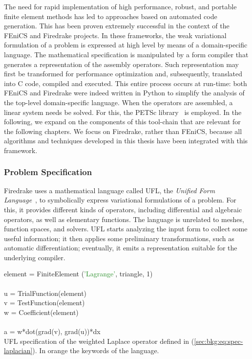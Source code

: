 The need for rapid implementation of high performance, robust, and portable finite element methods has led to approaches based on automated code generation. This has been proven extremely successful in the context of the FEniCS \citep{Fenics} and Firedrake \citep{firedrake-paper} projects. In these frameworks, the weak variational formulation of a problem is expressed at high level by means of a domain-specific language. The mathematical specification is manipulated by a form compiler that generates a representation of the assembly operators. Such representation may first be transformed for performance optimization and, subsequently, translated into C code, compiled and executed. This entire process occurs at run-time: both FEniCS and Firedrake were indeed written in Python to simplify the analysis of the top-level domain-specific language. When the operators are assembled, a linear system needs be solved. For this, the PETSc library~\citep{petsc-cite} is employed. In the following, we expand on the components of this tool-chain that are relevant for the following chapters. We focus on Firedrake, rather than FEniCS, because all algorithms and techniques developed in this thesis have been integrated with this framework.

\subsubsection{Problem Specification}
Firedrake uses a mathematical language called UFL, the {\em Unified Form Language}~\citep{ufl-cite}, to symbolically express variational formulations of a problem. For this, it provides different kinds of operators, including differential and algebraic operators, as well as elementary functions. The language is unrelated to meshes, function spaces, and solvers. UFL starts analyzing the input form to collect some useful information; it then applies some preliminary transformations, such as automatic differentiation; eventually, it emits a representation suitable for the underlying compiler.

\begin{algorithm}
\scriptsize\ttfamily
{}

element = \textcolor{RedOrange}{FiniteElement} (\textcolor{ForestGreen}{'Lagrange'}, \textcolor{RedOrange}{triangle}, 1)\\
~\\
u = \textcolor{RedOrange}{TrialFunction}(element)\\
v = \textcolor{RedOrange}{TestFunction}(element)\\
w = \textcolor{RedOrange}{Coefficient}(element)\\
~\\
a = w*\textcolor{RedOrange}{dot}(\textcolor{RedOrange}{grad}(v), \textcolor{RedOrange}{grad}(u))*\textcolor{RedOrange}{dx}\\

\caption{UFL specification of the weighted Laplace operator defined in (\ref{sec:bkg:eq:spec-laplacian}). In orange the keywords of the language. }
\label{code:ufl-laplace}
\end{algorithm}

